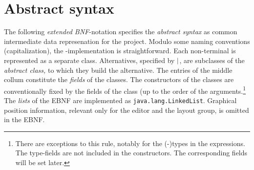 
\section{Abstract syntax}
\label{sec:abstractsyntax}


The following \emph{extended BNF}-notation specifies the \emph{abstract
  syntax} as common intermediate data represenation for the project. Modulo
some naming conventions (capitalization), the \Java-implementation is
straightforward. Each non-terminal is represented as a separate class.
Alternatives, specified by $\mid$, are subclasses of the \emph{abstract
  class,} to which they build the alternative. The entries of the middle
collum constitute the \emph{fields} of the classes. The constructors of the
classes are conventionally fixed by the fields of the class (up to the
order of the arguments.\footnote{There are exceptions to this rule, notably
  for the (\Slime-)types in the expressions. The type-fields are not
  included in the constructors. The corresponding fields will be set
  later.}  The \emph{lists} of the EBNF are implemented as
\texttt{java.lang.LinkedList}.  Graphical position information, relevant
only for the editor and the layout group, is omitted in the EBNF.


\medskip




